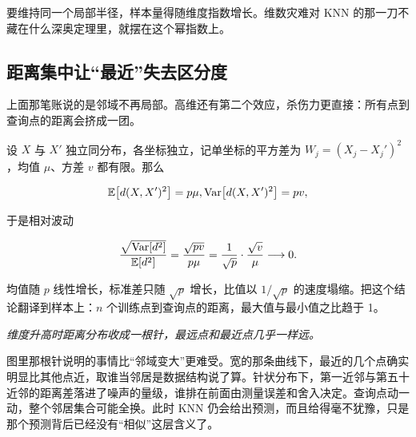 要维持同一个局部半径，样本量得随维度指数增长。维数灾难对 KNN 的那一刀不藏在什么深奥定理里，就摆在这个幂指数上。

\subsection{距离集中让``最近''失去区分度}

上面那笔账说的是邻域不再局部。高维还有第二个效应，杀伤力更直接：所有点到查询点的距离会挤成一团。

设 \(X\) 与 \(X'\) 独立同分布，各坐标独立，记单坐标的平方差为 \(W_j=(X_j-X_j')^2\)，均值 \(\mu\)、方差 \(v\) 都有限。那么

\[
\mathbb{E}\bigl[d(X,X')^2\bigr]=p\mu ,
\space
\operatorname{Var}\bigl[d(X,X')^2\bigr]=pv ,
\]

于是相对波动

\[
\frac{\sqrt{\operatorname{Var}[d^2]}}{\mathbb{E}[d^2]}=\frac{\sqrt{pv}}{p\mu}=\frac{1}{\sqrt p}\cdot\frac{\sqrt v}{\mu}
\longrightarrow 0 .
\]

均值随 \(p\) 线性增长，标准差只随 \(\sqrt p\) 增长，比值以 \(1/\sqrt p\) 的速度塌缩。把这个结论翻译到样本上：\(n\) 个训练点到查询点的距离，最大值与最小值之比趋于 1。

\begin{center}
\end{center}

\emph{维度升高时距离分布收成一根针，最远点和最近点几乎一样远。}

图里那根针说明的事情比``邻域变大''更难受。宽的那条曲线下，最近的几个点确实明显比其他点近，取谁当邻居是数据结构说了算。针状分布下，第一近邻与第五十近邻的距离差落进了噪声的量级，谁排在前面由测量误差和舍入决定。查询点动一动，整个邻居集合可能全换。此时 KNN 仍会给出预测，而且给得毫不犹豫，只是那个预测背后已经没有``相似''这层含义了。

